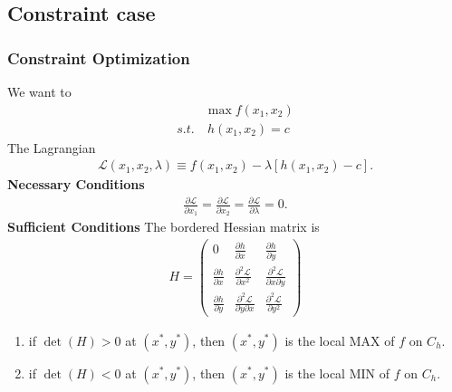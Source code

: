 \documentclass[
10pt, %
]{beamer}
\begin{document}
\subsection{Constraint case}
\begin{frame}
\frametitle{Constraint Optimization}
We want to
\begin{align*}
			& \max f(x_1,x_2)   \\
			s.t. & \ h(x_1, x_2) = c 
		\end{align*}
The Lagrangian
		\begin{align*}
			\mathcal{L} (x_1, x_2, \lambda) \equiv f(x_1, x_2) - \lambda [ h(x_1, x_2) - c]. 
		\end{align*}
\textbf{Necessary Conditions}
		\begin{align*}
			\frac{\partial \mathcal{L}}{\partial x_1} = 
			\frac{\partial \mathcal{L}}{\partial x_2} = 
			\frac{\partial \mathcal{L}}{\partial \lambda} = 0.
		\end{align*}
\textbf{Sufficient Conditions}
The bordered Hessian matrix is
		\begin{align*}
			H = \begin{pmatrix}
				0                             & \frac{\partial h}{\partial x}                        & \frac{\partial h}{\partial y}                        \\
				\frac{\partial h}{\partial x} & \frac{\partial^2 \mathcal{L}}{\partial x^2}          & \frac{\partial^2 \mathcal{L}}{\partial x \partial y} \\
				\frac{\partial h}{\partial y} & \frac{\partial^2 \mathcal{L}}{\partial y \partial x} & \frac{\partial^2 \mathcal{L}}{\partial y^2}          
			\end{pmatrix}
		\end{align*}
		\begin{enumerate}
			\item 		if $\det(H) > 0$ at $(x^*, y^*)$, then $(x^*, y^*)$ is the local MAX of $f$ on $C_h$.
			\item 		if $\det(H) < 0$ at $(x^*, y^*)$, then $(x^*, y^*)$ is the local MIN of $f$ on $C_h$.
		\end{enumerate}
\end{frame}
\end{document}
